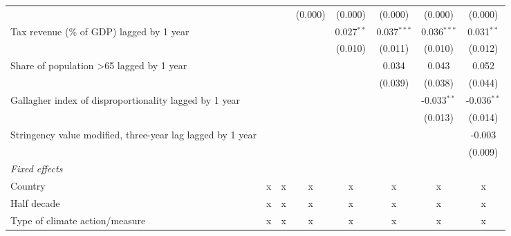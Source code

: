 \begin{tabular}{lccccccc}
                                                                                  &              &              & (0.000)      & (0.000)       & (0.000)       & (0.000)       & (0.000)\\   
   Tax revenue (\% of GDP) lagged by 1 year                                       &              &              &              & 0.027$^{**}$  & 0.037$^{***}$ & 0.036$^{***}$ & 0.031$^{**}$\\   
                                                                                  &              &              &              & (0.010)       & (0.011)       & (0.010)       & (0.012)\\   
   Share of population >65 lagged by 1 year                                       &              &              &              &               & 0.034         & 0.043         & 0.052\\   
                                                                                  &              &              &              &               & (0.039)       & (0.038)       & (0.044)\\   
   Gallagher index of disproportionality lagged by 1 year                         &              &              &              &               &               & -0.033$^{**}$ & -0.036$^{**}$\\   
                                                                                  &              &              &              &               &               & (0.013)       & (0.014)\\   
   Stringency value modified, three-year lag lagged by 1 year                     &              &              &              &               &               &               & -0.003\\   
                                                                                  &              &              &              &               &               &               & (0.009)\\   
   \emph{Fixed effects}\\
   Country                                                                        & x            & x            & x            & x             & x             & x             & x\\  
   Half decade                                                                    & x            & x            & x            & x             & x             & x             & x\\  
   Type of climate action/measure                                                 & x            & x            & x            & x             & x             & x             & x\\  

\end{tabular}
